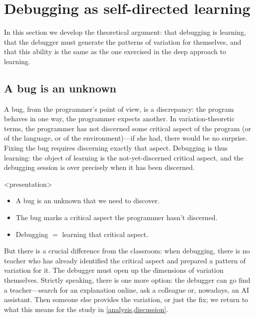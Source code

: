 \mode*
\section{Debugging as self-directed learning}
\label{debugging-as-learning}

In this section we develop the theoretical argument: that debugging is
learning, that the debugger must generate the patterns of variation for
themselves, and that this ability is the same as the one exercised in the deep
approach to learning.

\subsection{A bug is an unknown}

A bug, from the programmer's point of view, is a discrepancy: the program
behaves in one way, the programmer expects another.
In variation-theoretic terms, the programmer has not discerned some critical
aspect of the program (or of the language, or of the environment)---if she
had, there would be no surprise.
Fixing the bug requires discerning exactly that aspect.
Debugging is thus learning: the object of learning is the not-yet-discerned
critical aspect, and the debugging session is over precisely when it has been
discerned.

\begin{frame}<presentation>
  \begin{idea}
    \begin{itemize}
      \item A bug is an unknown that we need to discover.
      \item The bug marks a critical aspect the programmer hasn't discerned.
      \item Debugging \(=\) learning that critical aspect.
    \end{itemize}
  \end{idea}
\end{frame}

But there is a crucial difference from the classroom: when debugging, there is
no teacher who has already identified the critical aspect and prepared a
pattern of variation for it.
The debugger must open up the dimensions of variation themselves.
Strictly speaking, there is one more option: the debugger can go find a
teacher---search for an explanation online, ask a colleague or, nowadays,
an AI assistant.
Then someone else provides the variation, or just the fix; we return to
what this means for the study in \cref{analysis,discussion}.

